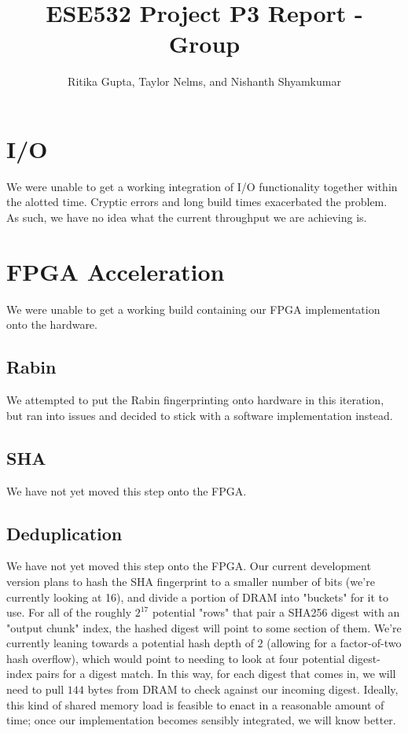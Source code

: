 \documentclass{article}
\title{ESE532 Project P3 Report - Group}
\author{Ritika Gupta, Taylor Nelms, and Nishanth Shyamkumar}
\begin{document}
\maketitle


\section{I/O}

We were unable to get a working integration of I/O functionality together within the alotted time. Cryptic errors and long build times exacerbated the problem. As such, we have no idea what the current throughput we are achieving is.

\section{FPGA Acceleration}

We were unable to get a working build containing our FPGA implementation onto the hardware.

\subsection{Rabin}

We attempted to put the Rabin fingerprinting onto hardware in this iteration, but ran into issues and decided to stick with a software implementation instead.

\subsection{SHA}

We have not yet moved this step onto the FPGA.

\subsection{Deduplication}

We have not yet moved this step onto the FPGA. Our current development version plans to hash the SHA fingerprint to a smaller number of bits (we're currently looking at 16), and divide a portion of DRAM into "buckets" for it to use. For all of the roughly $2^{17}$ potential "rows" that pair a SHA256 digest with an "output chunk" index, the hashed digest will point to some section of them. We're currently leaning towards a potential hash depth of $2$ (allowing for a factor-of-two hash overflow), which would point to needing to look at four potential digest-index pairs for a digest match.
\newline\newline
In this way, for each digest that comes in, we will need to pull $144$ bytes from DRAM to check against our incoming digest. Ideally, this kind of shared memory load is feasible to enact in a reasonable amount of time; once our implementation becomes sensibly integrated, we will know better.
\end{document}
